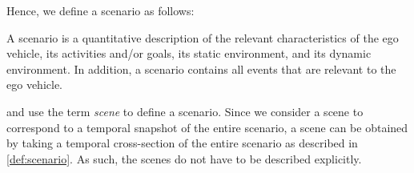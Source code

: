 Hence, we define a scenario as follows:
\begin{definition}[Scenario]\label{def:scenario}
	A scenario is a quantitative description of the relevant characteristics of the ego vehicle, its activities and/or goals, its static environment, and its dynamic environment. In addition, a scenario contains all events that are relevant to the ego vehicle.
\end{definition}


\textcite{geyer2014} and \textcite{ulbrich2015} use the term \emph{scene} to define a scenario.
\cstartb Since we consider a scene to correspond to a temporal snapshot of the entire scenario, a scene can be obtained by taking a temporal cross-section of the entire scenario as described in \cref{def:scenario}. As such\cendb, the scenes do not have to be described explicitly.





